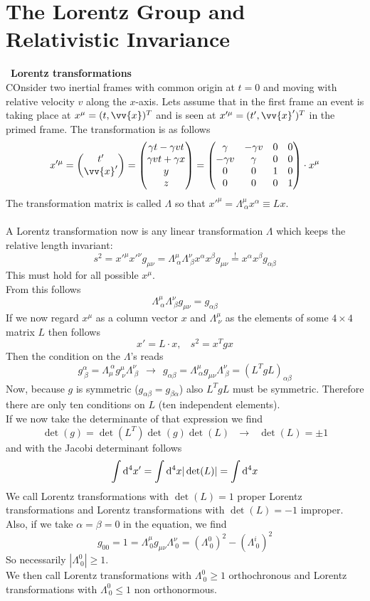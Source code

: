 \documentclass{include/thesisclass}
\newcommand{\cc}{\cdot}
\newcommand{\vx}{\vv{x}}
\newcommand{\df}{\rightarrow}
\newcommand{\dd}{{\rm d}}
\newcommand{\soll}{\overset{!}{=}}
\newcommand{\vektorz}[2]{\begin{pmatrix} #1 \\ #2 \end{pmatrix}}
\newcommand{\sub}[1]{~\newline\newline\textbf{#1}\\}
\begin{document}
\section{The Lorentz Group and Relativistic Invariance}
\sub{Lorentz transformations}
COnsider two inertial frames with common origin at $t = 0$ and moving with relative velocity $v$ along the $x$-axis. Lets assume that in the first frame an event is taking place at $x^\mu = (t, \vx)^T$ and is seen at $x'^\mu = (t', \vx')^T$ in the primed frame. The transformation is as follows
\[ x'^\mu = \vektorz{t'}{\vx'} = \begin{pmatrix} \gamma t - \gamma v t \\  \gamma v t + \gamma x\\ y \\z\end{pmatrix} = \begin{pmatrix} \gamma & - \gamma v & 0 & 0 \\ -\gamma v & \gamma & 0 & 0 \\ 0 & 0 & 1 & 0 \\ 0 & 0 & 0 & 1\end{pmatrix}\cc x^\mu\]
The transformation matrix is called $\Lambda$ so that $x'^\mu = \Lambda^\mu_{~\alpha} x^\alpha \equiv L x$.\\
\\A Lorentz transformation now is any linear transformation $\Lambda$ which keeps the relative length invariant:
\[ s^2 = x'^\mu x'^\nu g_{\mu\nu} = \Lambda^\mu_{~\alpha} \Lambda^\nu_{~\beta}x^\alpha x^\beta g_{\mu\nu}\soll x^\alpha x^\beta g_{\alpha\beta}\]
This must hold for all possible $x^\mu$.\\
From this follows
\[ \Lambda^\mu_{~\alpha} \Lambda^\nu_{~\beta} g_{\mu\nu} = g_{\alpha\beta}\]
If we now regard $x^\mu$ as a column vector $x$ and $\Lambda^\mu_{~\nu}$ as the elements of some $4\times 4$ matrix $L$ then follows
\[x' = L \cc x, ~~~~ s^2 = x^Tg x\]
Then the condition on the $\Lambda$'s reads
\[g^\alpha_{~\beta} = \Lambda_\mu^{~\alpha} g^\mu_{~\nu} \Lambda^\nu_{~\beta}~~\df~~ g_{\alpha\beta} = \Lambda^\mu_{~\alpha} g_{\mu\nu}\Lambda^\nu_{~\beta} = (L^TgL)_{\alpha\beta}\]
Now, because $g$ is symmetric ($g_{\alpha\beta} = g_{\beta\alpha}$) also $L^TgL$ must be symmetric. Therefore there are only ten conditions on $L$ (ten independent elements).\\
If we now take the determinante of that expression we find
\[\det(g) = \det(L^T)\det(g) \det(L)~~~\df~~~ \det(L) = \pm 1\]
and with the Jacobi determinant follows
\[ \int \dd ^4 x' = \int \dd ^4 x| \det(L) | = \int \dd ^4 x\]
We call Lorentz transformations with $\det(L) = 1$ proper Lorentz transformations and Lorentz transformations with $\det(L) = -1$ improper.\\
Also, if we take $\alpha = \beta = 0$ in the equation, we find 
\[g_{00} = 1 = \Lambda^{\mu}_{~0} g_{\mu\nu} \Lambda^\nu_{~0} = (\Lambda^0_{~0})^2 - (\Lambda^i_{~0})^2\]
So necessarily $|\Lambda^0_{~0}| \geq 1$.\\
We then call Lorentz transformations with $\Lambda^0_{~0} \geq 1$ orthochronous and Lorentz transformations with $\Lambda^0_{~0} \leq 1$ non orthonormous.
\end{document}

